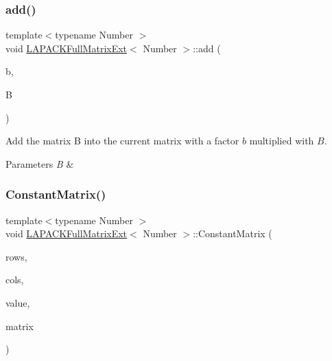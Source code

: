 \subsubsection{\texorpdfstring{add()}{add()}\hspace{0.1cm}{\footnotesize\ttfamily [4/4]}}
{\footnotesize\ttfamily template$<$typename Number $>$ \\
void \hyperlink{classLAPACKFullMatrixExt}{L\+A\+P\+A\+C\+K\+Full\+Matrix\+Ext}$<$ Number $>$\+::add (\begin{DoxyParamCaption}\item[{const Number}]{b,  }\item[{const \hyperlink{classLAPACKFullMatrixExt}{L\+A\+P\+A\+C\+K\+Full\+Matrix\+Ext}$<$ Number $>$ \&}]{B }\end{DoxyParamCaption})}

Add the matrix {\ttfamily B} into the current matrix with a factor $b$ multiplied with $B$. 
\begin{DoxyParams}{Parameters}
{\em B} & \\
\hline
\end{DoxyParams}
\mbox{\label{classLAPACKFullMatrixExt_a82a4dc9f9f5de6913e26f479eb3880f7}} 
\subsubsection{\texorpdfstring{Constant\+Matrix()}{ConstantMatrix()}}
{\footnotesize\ttfamily template$<$typename Number $>$ \\
void \hyperlink{classLAPACKFullMatrixExt}{L\+A\+P\+A\+C\+K\+Full\+Matrix\+Ext}$<$ Number $>$\+::Constant\+Matrix (\begin{DoxyParamCaption}\item[{const \hyperlink{classLAPACKFullMatrixExt_a5cf5f4a6104dc17029210b5ca52bf574}{size\+\_\+type}}]{rows,  }\item[{const \hyperlink{classLAPACKFullMatrixExt_a5cf5f4a6104dc17029210b5ca52bf574}{size\+\_\+type}}]{cols,  }\item[{Number}]{value,  }\item[{\hyperlink{classLAPACKFullMatrixExt}{L\+A\+P\+A\+C\+K\+Full\+Matrix\+Ext}$<$ Number $>$ \&}]{matrix }\end{DoxyParamCaption})\hspace{0.3cm}{\ttfamily [static]}}


